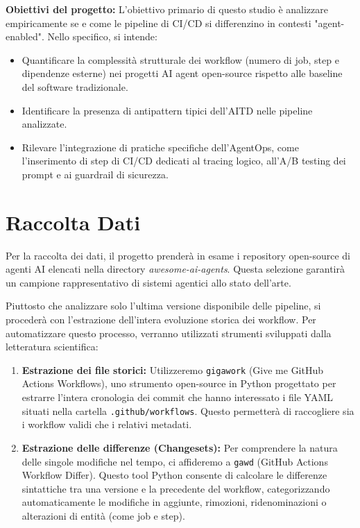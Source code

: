 \documentclass[a4paper,11pt]{article}
\begin{document}
\textbf{Obiettivi del progetto:}
L'obiettivo primario di questo studio è analizzare empiricamente se e come le pipeline di CI/CD si differenzino in contesti "agent-enabled". Nello specifico, si intende:
\begin{itemize}
    \item Quantificare la complessità strutturale dei workflow (numero di job, step e dipendenze esterne) nei progetti AI agent open-source rispetto alle baseline del software tradizionale.
    \item Identificare la presenza di antipattern tipici dell'AITD nelle pipeline analizzate.
    \item Rilevare l'integrazione di pratiche specifiche dell'AgentOps, come l'inserimento di step di CI/CD dedicati al tracing logico, all'A/B testing dei prompt e ai guardrail di sicurezza.
\end{itemize}

\section{Raccolta Dati}
Per la raccolta dei dati, il progetto prenderà in esame i repository open-source di agenti AI elencati nella directory \textit{awesome-ai-agents}. Questa selezione garantirà un campione rappresentativo di sistemi agentici allo stato dell'arte. 

Piuttosto che analizzare solo l'ultima versione disponibile delle pipeline, si procederà con l'estrazione dell'intera evoluzione storica dei workflow. Per automatizzare questo processo, verranno utilizzati strumenti sviluppati dalla letteratura scientifica:
\begin{enumerate}
    \item \textbf{Estrazione dei file storici:} Utilizzeremo \texttt{gigawork} (Give me GitHub Actions Workflows), uno strumento open-source in Python progettato per estrarre l'intera cronologia dei commit che hanno interessato i file YAML situati nella cartella \texttt{.github/workflows}. Questo permetterà di raccogliere sia i workflow validi che i relativi metadati.
    \item \textbf{Estrazione delle differenze (Changesets):} Per comprendere la natura delle singole modifiche nel tempo, ci affideremo a \texttt{gawd} (GitHub Actions Workflow Differ). Questo tool Python consente di calcolare le differenze sintattiche tra una versione e la precedente del workflow, categorizzando automaticamente le modifiche in aggiunte, rimozioni, ridenominazioni o alterazioni di entità (come job e step).
\end{enumerate}
\end{document}
